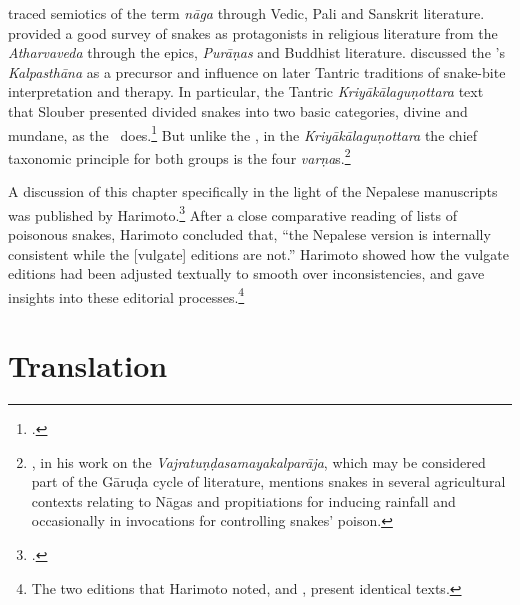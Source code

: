             
            
\citet{seme-1979} traced semiotics of the term \emph{nāga} through
Vedic, Pali and Sanskrit literature.  \citet{doni-2015} provided a
good survey of snakes as protagonists in religious literature from the
\emph{Atharvaveda} through the epics, \emph{Purāṇas} and Buddhist
literature. \citet[31--33 \emph{et passim}]{slou-2016} discussed the
\SS's \emph{Kalpasthāna} as a precursor and influence on later Tantric
traditions of snake-bite interpretation and therapy.  In particular,
the Tantric \emph{Kriyākālaguṇottara} text that Slouber presented
divided snakes into two basic categories, divine and mundane, as the
\SS\ does.\footcite[144--145]{slou-2016}  But unlike the \SS, in the
\emph{Kriyākālaguṇottara} the chief taxonomic principle for both
groups is the four \emph{varṇa}s.\footnote{\cite[passim]{hida-2019},
    in his work on the \emph{Vajratuṇḍasamayakalparāja}, which may be
    considered part of the Gāruḍa cycle of literature, mentions snakes in
    several agricultural contexts relating to Nāgas and propitiations for
    inducing rainfall and occasionally in invocations for controlling
    snakes' poison.}
            
            
            A discussion of this chapter specifically in the light of the
            Nepalese manuscripts was published by
            Harimoto.\footcite[101--104]{hari-2011} After a close comparative
            reading of lists of poisonous snakes, Harimoto concluded that, “the
            Nepalese version is internally consistent while the [vulgate]
            editions are not.”  Harimoto showed how the vulgate editions had been
            adjusted textually to smooth over inconsistencies, and gave insights
            into these editorial processes.\footnote{The two editions that
                Harimoto noted, \cite{vulgate} and \cite{bhat-1889}, present
                identical texts.}
                
                
                
                

\section{Translation}

